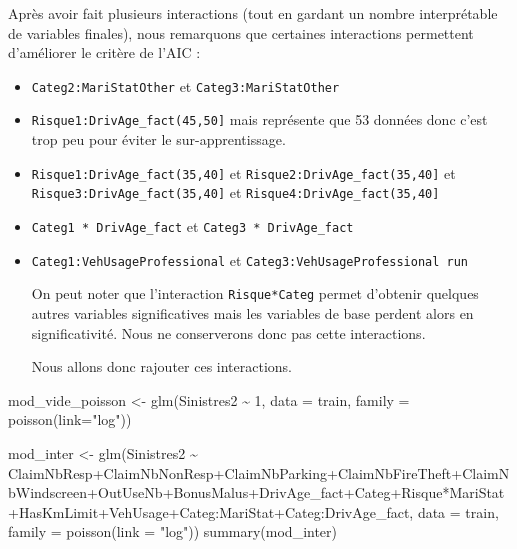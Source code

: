 \documentclass[
]{article}
\newenvironment{Shaded}{\begin{snugshade}}{\end{snugshade}}
\newcommand{\AttributeTok}[1]{\textcolor[rgb]{0.77,0.63,0.00}{#1}}
\newcommand{\DecValTok}[1]{\textcolor[rgb]{0.00,0.00,0.81}{#1}}
\newcommand{\FunctionTok}[1]{\textcolor[rgb]{0.00,0.00,0.00}{#1}}
\newcommand{\NormalTok}[1]{#1}
\newcommand{\OtherTok}[1]{\textcolor[rgb]{0.56,0.35,0.01}{#1}}
\newcommand{\SpecialCharTok}[1]{\textcolor[rgb]{0.00,0.00,0.00}{#1}}
\newcommand{\StringTok}[1]{\textcolor[rgb]{0.31,0.60,0.02}{#1}}
\begin{document}
Après avoir fait plusieurs interactions (tout en gardant un nombre
interprétable de variables finales), nous remarquons que certaines
interactions permettent d'améliorer le critère de l'AIC :

\begin{itemize}
\item
  \texttt{Categ2:MariStatOther} et \texttt{Categ3:MariStatOther}
\item
  \texttt{Risque1:DrivAge\_fact(45,50{]}} mais représente que 53 données
  donc c'est trop peu pour éviter le sur-apprentissage.
\item
  \texttt{Risque1:DrivAge\_fact(35,40{]}} et
  \texttt{Risque2:DrivAge\_fact(35,40{]}} et
  \texttt{Risque3:DrivAge\_fact(35,40{]}} et
  \texttt{Risque4:DrivAge\_fact(35,40{]}}
\item
  \texttt{Categ1\ *\ DrivAge\_fact} et \texttt{Categ3\ *\ DrivAge\_fact}
\item
  \texttt{Categ1:VehUsageProfessional} et
  \texttt{Categ3:VehUsageProfessional\ run}

  On peut noter que l'interaction \texttt{Risque*Categ} permet d'obtenir
  quelques autres variables significatives mais les variables de base
  perdent alors en significativité. Nous ne conserverons donc pas cette
  interactions.

  Nous allons donc rajouter ces interactions.
\end{itemize}

\begin{Shaded}
\begin{Highlighting}[]
\NormalTok{mod\_vide\_poisson }\OtherTok{\textless{}{-}} \FunctionTok{glm}\NormalTok{(Sinistres2 }\SpecialCharTok{\textasciitilde{}} \DecValTok{1}\NormalTok{, }\AttributeTok{data =}\NormalTok{ train, }\AttributeTok{family =} \FunctionTok{poisson}\NormalTok{(}\AttributeTok{link=}\StringTok{"log"}\NormalTok{))}
\end{Highlighting}
\end{Shaded}

\begin{Shaded}
\begin{Highlighting}[]
\NormalTok{mod\_inter }\OtherTok{\textless{}{-}} \FunctionTok{glm}\NormalTok{(Sinistres2 }\SpecialCharTok{\textasciitilde{}}\NormalTok{ ClaimNbResp}\SpecialCharTok{+}\NormalTok{ClaimNbNonResp}\SpecialCharTok{+}\NormalTok{ClaimNbParking}\SpecialCharTok{+}\NormalTok{ClaimNbFireTheft}\SpecialCharTok{+}\NormalTok{ClaimNbWindscreen}\SpecialCharTok{+}\NormalTok{OutUseNb}\SpecialCharTok{+}\NormalTok{BonusMalus}\SpecialCharTok{+}\NormalTok{DrivAge\_fact}\SpecialCharTok{+}\NormalTok{Categ}\SpecialCharTok{+}\NormalTok{Risque}\SpecialCharTok{*}\NormalTok{MariStat}\SpecialCharTok{+}\NormalTok{HasKmLimit}\SpecialCharTok{+}\NormalTok{VehUsage}\SpecialCharTok{+}\NormalTok{Categ}\SpecialCharTok{:}\NormalTok{MariStat}\SpecialCharTok{+}\NormalTok{Categ}\SpecialCharTok{:}\NormalTok{DrivAge\_fact, }\AttributeTok{data =}\NormalTok{ train, }\AttributeTok{family =} \FunctionTok{poisson}\NormalTok{(}\AttributeTok{link =} \StringTok{"log"}\NormalTok{))}
\FunctionTok{summary}\NormalTok{(mod\_inter)}
\end{Highlighting}
\end{Shaded}
\end{document}
